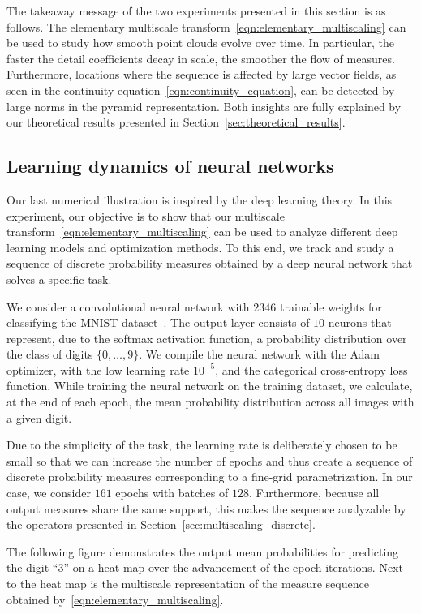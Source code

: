\documentclass[12pt]{amsart}
\begin{document}
The takeaway message of the two experiments presented in this section is as follows. The elementary multiscale transform~\eqref{eqn:elementary_multiscaling} can be used to study how smooth point clouds evolve over time. In particular, the faster the detail coefficients decay in scale, the smoother the flow of measures. Furthermore, locations where the sequence is affected by large vector fields, as seen in the continuity equation~\eqref{eqn:continuity_equation}, can be detected by large norms in the pyramid representation. Both insights are fully explained by our theoretical results presented in Section~\ref{sec:theoretical_results}.

\subsection{Learning dynamics of neural networks}

Our last numerical illustration is inspired by the deep learning theory. In this experiment, our objective is to show that our multiscale transform~\eqref{eqn:elementary_multiscaling} can be used to analyze different deep learning models and optimization methods. To this end, we track and study a sequence of discrete probability measures obtained by a deep neural network that solves a specific task.

We consider a convolutional neural network with $2346$ trainable weights for classifying the MNIST dataset~\cite{deng2012mnist}. The output layer consists of $10$ neurons that represent, due to the softmax activation function, a probability distribution over the class of digits $\{0,\dots,9\}$. We compile the neural network with the Adam optimizer, with the low learning rate $10^{-5}$, and the categorical cross-entropy loss function. While training the neural network on the training dataset, we calculate, at the end of each epoch, the mean probability distribution across all images with a given digit.

Due to the simplicity of the task, the learning rate is deliberately chosen to be small so that we can increase the number of epochs and thus create a sequence of discrete probability measures corresponding to a fine-grid parametrization. In our case, we consider $161$ epochs with batches of $128$. Furthermore, because all output measures share the same support, this makes the sequence analyzable by the operators presented in Section~\ref{sec:multiscaling_discrete}.

The following figure demonstrates the output mean probabilities for predicting the digit ``$3$'' on a heat map over the advancement of the epoch iterations. Next to the heat map is the multiscale representation of the measure sequence obtained by~\eqref{eqn:elementary_multiscaling}.
\end{document}
